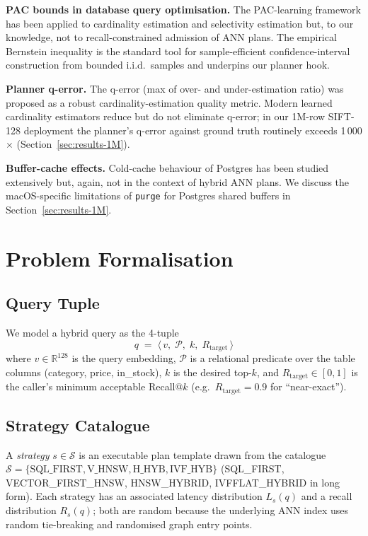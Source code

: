 \documentclass[conference]{IEEEtran}
\begin{document}
\textbf{PAC bounds in database query optimisation.}  The
PAC-learning framework has been applied to cardinality
estimation and selectivity estimation but, to our knowledge, not to
recall-constrained admission of ANN plans.  The empirical
Bernstein inequality is the standard tool for sample-efficient
confidence-interval construction from bounded i.i.d.\ samples and
underpins our planner hook.

\textbf{Planner q-error.}  The q-error (max of over- and
under-estimation ratio) was proposed as a robust
cardinality-estimation quality metric.  Modern learned cardinality
estimators reduce but do not eliminate q-error; in our 1M-row
SIFT-128 deployment the planner's q-error against ground truth
routinely exceeds 1\,000$\times$ (Section~\ref{sec:results-1M}).

\textbf{Buffer-cache effects.}  Cold-cache behaviour of Postgres
has been studied extensively but, again, not in the context of
hybrid ANN plans.  We discuss the macOS-specific limitations of
\texttt{purge} for Postgres shared buffers in
Section~\ref{sec:results-1M}.

\section{Problem Formalisation}
\label{sec:problem}

\subsection{Query Tuple}
We model a hybrid query as the 4-tuple
\begin{equation}
  q \;=\; \bigl\langle\, v,\; \mathcal{P},\; k,\; R_{\text{target}} \,\bigr\rangle
\end{equation}
where $v \in \mathbb{R}^{128}$ is the query embedding,
$\mathcal{P}$ is a relational predicate over the table columns
(category, price, in\_stock), $k$ is the desired top-$k$, and
$R_{\text{target}} \in [0, 1]$ is the caller's minimum acceptable
Recall@$k$ (e.g.\ $R_{\text{target}} = 0.9$ for ``near-exact'').

\subsection{Strategy Catalogue}
\begin{sloppypar}
A \emph{strategy} $s \in \mathcal{S}$ is an executable plan
template drawn from the catalogue
$\mathcal{S} = \{\text{SQL\_FIRST}, \text{V\_HNSW},
\text{H\_HYB}, \text{IVF\_HYB}\}$
(SQL\_FIRST, VECTOR\_FIRST\_HNSW, HNSW\_HYBRID, IVFFLAT\_HYBRID
in long form).
Each strategy has an associated latency distribution
$L_s(q)$ and a recall distribution $R_s(q)$; both are random
because the underlying ANN index uses random tie-breaking and
randomised graph entry points.
\end{sloppypar}
\end{document}

